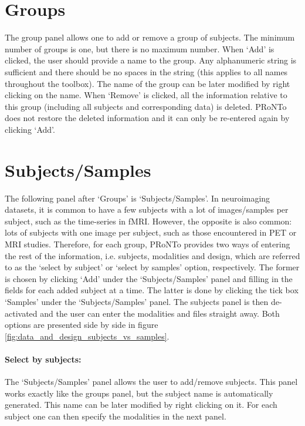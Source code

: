 \section{Groups}

The group panel allows one to add or remove a group of subjects. The minimum number of groups is one, but there is no maximum number. When `Add' is clicked, the user should provide a name to the group. Any alphanumeric string is sufficient and there should be no spaces in the string (this applies to all names throughout the toolbox). The name of the group can be later modified by right clicking on the name. When `Remove' is clicked, all the information relative to this group (including all subjects and corresponding data) is deleted. PRoNTo does not restore the deleted information and it can only be re-entered again by clicking `Add'.


\section{Subjects/Samples}
\label{sec:SelectBySection}

The following panel after `Groups' is `Subjects/Samples'. In neuroimaging datasets, it is common to have a few subjects with a lot of images/samples per subject, such as the time-series in fMRI. However, the opposite is also common: lots of subjects with one image per subject, such as those encountered in PET or MRI studies. Therefore, for each group, PRoNTo provides two ways of entering the rest of the information, i.e. subjects, modalities and design, which are referred to as the `select by subject' or `select by samples' option, respectively. The former is chosen by clicking `Add' under the `Subjects/Samples' panel and filling in the fields for each added subject at a time. The latter is done by clicking the tick box `Samples' under the `Subjects/Samples' panel. The subjects panel is then de-activated and the user can enter the modalities and files straight away. Both options are presented side by side in figure \ref{fig:data_and_design_subjects_vs_samples}.


\paragraph{Select by subjects:} The `Subjects/Samples' panel allows the user to add/remove subjects. This panel works exactly like the groups panel, but the subject name is automatically generated. This name can be later modified by right clicking on it. For each subject one can then specify the modalities in the next panel.

